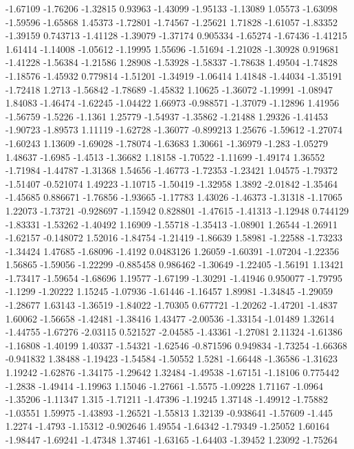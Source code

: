 \documentclass[9pt]{article}
\theoremstyle{plain}
\theoremstyle{definition}
\theoremstyle{remark}
\numberwithin{equation}{section}
\begin{document}
-1.67109
-1.76206
-1.32815
0.93963
-1.43099
-1.95133
-1.13089
1.05573
-1.63098
-1.59596
-1.65868
1.45373
-1.72801
-1.74567
-1.25621
1.71828
-1.61057
-1.83352
-1.39159
0.743713
-1.41128
-1.39079
-1.37174
0.905334
-1.65274
-1.67436
-1.41215
1.61414
-1.14008
-1.05612
-1.19995
1.55696
-1.51694
-1.21028
-1.30928
0.919681
-1.41228
-1.56384
-1.21586
1.28908
-1.53928
-1.58337
-1.78638
1.49504
-1.74828
-1.18576
-1.45932
0.779814
-1.51201
-1.34919
-1.06414
1.41848
-1.44034
-1.35191
-1.72418
1.2713
-1.56842
-1.78689
-1.45832
1.10625
-1.36072
-1.19991
-1.08947
1.84083
-1.46474
-1.62245
-1.04422
1.66973
-0.988571
-1.37079
-1.12896
1.41956
-1.56759
-1.5226
-1.1361
1.25779
-1.54937
-1.35862
-1.21488
1.29326
-1.41453
-1.90723
-1.89573
1.11119
-1.62728
-1.36077
-0.899213
1.25676
-1.59612
-1.27074
-1.60243
1.13609
-1.69028
-1.78074
-1.63683
1.30661
-1.36979
-1.283
-1.05279
1.48637
-1.6985
-1.4513
-1.36682
1.18158
-1.70522
-1.11699
-1.49174
1.36552
-1.71984
-1.44787
-1.31368
1.54656
-1.46773
-1.72353
-1.23421
1.04575
-1.79372
-1.51407
-0.521074
1.49223
-1.10715
-1.50419
-1.32958
1.3892
-2.01842
-1.35464
-1.45685
0.886671
-1.76856
-1.93665
-1.17783
1.43026
-1.46373
-1.31318
-1.17065
1.22073
-1.73721
-0.928697
-1.15942
0.828801
-1.47615
-1.41313
-1.12948
0.744129
-1.83331
-1.53262
-1.40492
1.16909
-1.55718
-1.35413
-1.08901
1.26544
-1.26911
-1.62157
-0.148072
1.52016
-1.84754
-1.21419
-1.86639
1.58981
-1.22588
-1.73233
-1.34424
1.47685
-1.68096
-1.4192
0.0483126
1.26059
-1.60391
-1.07204
-1.22356
1.56865
-1.59056
-1.22299
-0.885458
0.986462
-1.30649
-1.22405
-1.56191
1.13421
-1.73417
-1.59654
-1.68696
1.19577
-1.67199
-1.30291
-1.41946
0.950077
-1.79795
-1.1299
-1.20222
1.15245
-1.07936
-1.61446
-1.16457
1.89981
-1.34845
-1.29059
-1.28677
1.63143
-1.36519
-1.84022
-1.70305
0.677721
-1.20262
-1.47201
-1.4837
1.60062
-1.56658
-1.42481
-1.38416
1.43477
-2.00536
-1.33154
-1.01489
1.32614
-1.44755
-1.67276
-2.03115
0.521527
-2.04585
-1.43361
-1.27081
2.11324
-1.61386
-1.16808
-1.40199
1.40337
-1.54321
-1.62546
-0.871596
0.949834
-1.73254
-1.66368
-0.941832
1.38488
-1.19423
-1.54584
-1.50552
1.5281
-1.66448
-1.36586
-1.31623
1.19242
-1.62876
-1.34175
-1.29642
1.32484
-1.49538
-1.67151
-1.18106
0.775442
-1.2838
-1.49414
-1.19963
1.15046
-1.27661
-1.5575
-1.09228
1.71167
-1.0964
-1.35206
-1.11347
1.315
-1.71211
-1.47396
-1.19245
1.37148
-1.49912
-1.75882
-1.03551
1.59975
-1.43893
-1.26521
-1.55813
1.32139
-0.938641
-1.57609
-1.445
1.2274
-1.4793
-1.15312
-0.902646
1.49554
-1.64342
-1.79349
-1.25052
1.60164
-1.98447
-1.69241
-1.47348
1.37461
-1.63165
-1.64403
-1.39452
1.23092
-1.75264
\end{document}
